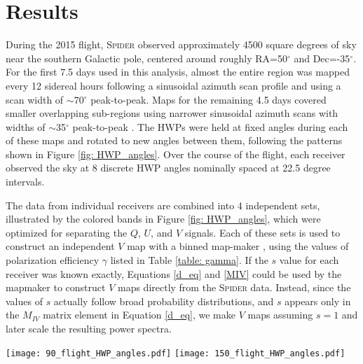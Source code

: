 \documentclass[twocolumn]{aastex61}
\begin{document}
\section{Results}
\label{sec:limit}

During the 2015 flight, \textsc{Spider} observed approximately 4500 square degrees of sky near the southern Galactic pole, centered around roughly RA=50$^\circ$ and Dec=-35$^\circ$. For the first 7.5 days used in this analysis, almost the entire region was mapped every 12 sidereal hours following a sinusoidal azimuth scan profile and using a scan width of $\sim$70$^\circ$ peak-to-peak.  Maps for the remaining 4.5 days covered smaller overlapping sub-regions using narrower sinusoidal azimuth scans with widths of $\sim$35$^\circ$ peak-to-peak \citep{Jamil_thesis}.  The HWPs were held at fixed angles during each of these maps and rotated to new angles between them, following the patterns shown in Figure \ref{fig: HWP_angles}.  Over the course of the flight, each receiver observed the sky at 8 discrete HWP angles nominally spaced at 22.5 degree intervals.

The data from individual receivers are combined into 4 independent sets, illustrated by the colored bands in Figure \ref{fig: HWP_angles}, which were optimized for separating the $Q$, $U$, and $V$ signals.  Each of these sets is used to construct an independent $V$ map with a binned map-maker \citep{Sasha_thesis}, using the values of polarization efficiency $\gamma$ listed in Table \ref{table: gamma}.  If the $s$ value for each receiver was known exactly, Equations \ref{d_eq} and \ref{MIV} could be used by the mapmaker to construct $V$ maps directly from the \textsc{Spider} data.  Instead, since the values of $s$ actually follow broad probability distributions, and $s$ appears only in the $M_{IV}$ matrix element in Equation \ref{d_eq}, we make $V$ maps assuming $s=1$ and later scale the resulting power spectra.

\begin{figure*}
\begin{centering}
\texttt{[image: 90\_flight\_HWP\_angles.pdf]}
\texttt{[image: 150\_flight\_HWP\_angles.pdf]}
\par
\end{centering}

\caption{The HWP observing angles from \textsc{Spider}'s 2015 flight.  These angles are defined relative to the slow crystal axis, and the error on the angle difference $2\theta_{HWP} - 2 \xi_{det}$ from Equation~\ref{MIV} is $<1$ degree.  The nominal HWP angles are spaced at integer multiples of 22.5 degrees, and the receivers spent approximately 12 sidereal hours observing at each HWP position, covering the desired region once during that time.  The shaded colors indicate sets of maps on each receiver that were combined to make the cross-spectra described in Section \ref{sec:limit}.  Each set contains an approximately equal amount of data and includes maps made with both wide and narrow scans.  The unique combination of maps on the X1 receiver compensates for an offset of 22.5 degrees from the intended rotation schedule.} 
\label{fig: HWP_angles}
\end{figure*}
\end{document}
